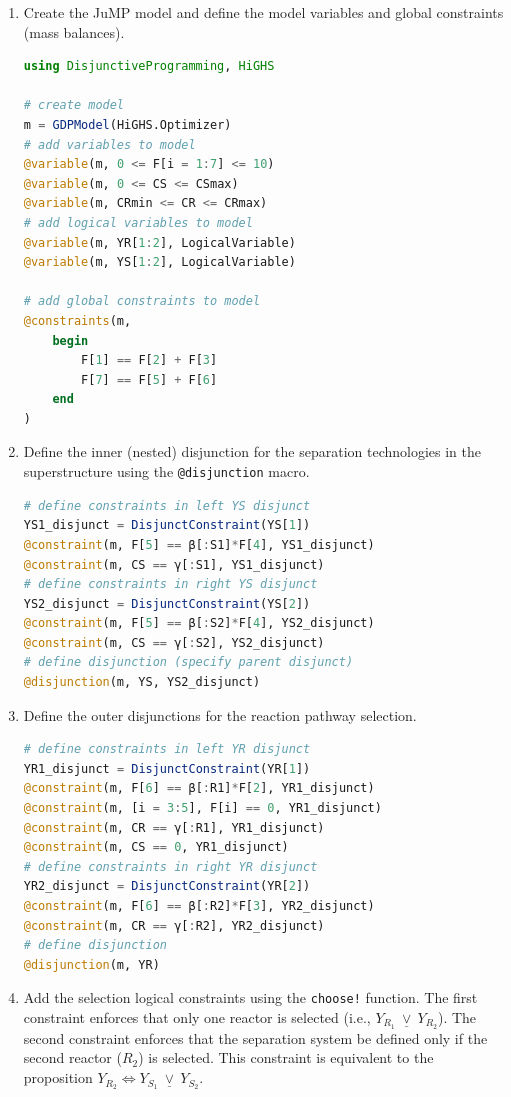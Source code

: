 \documentclass{juliacon}
\begin{document}
\begin{enumerate}
    \item Create the JuMP model and define the model variables and global constraints (mass balances).

\begin{lstlisting}[language = Julia]
using DisjunctiveProgramming, HiGHS

# create model
m = GDPModel(HiGHS.Optimizer)
# add variables to model
@variable(m, 0 <= F[i = 1:7] <= 10)
@variable(m, 0 <= CS <= CSmax)
@variable(m, CRmin <= CR <= CRmax)
# add logical variables to model
@variable(m, YR[1:2], LogicalVariable)
@variable(m, YS[1:2], LogicalVariable)

# add global constraints to model
@constraints(m,
    begin
        F[1] == F[2] + F[3]
        F[7] == F[5] + F[6]
    end
)
\end{lstlisting}
    \item Define the inner (nested) disjunction for the separation technologies in the superstructure using the \verb|@disjunction| macro.
\begin{lstlisting}[language = Julia]
# define constraints in left YS disjunct
YS1_disjunct = DisjunctConstraint(YS[1])
@constraint(m, F[5] == β[:S1]*F[4], YS1_disjunct)
@constraint(m, CS == γ[:S1], YS1_disjunct)
# define constraints in right YS disjunct
YS2_disjunct = DisjunctConstraint(YS[2])
@constraint(m, F[5] == β[:S2]*F[4], YS2_disjunct)
@constraint(m, CS == γ[:S2], YS2_disjunct)
# define disjunction (specify parent disjunct)
@disjunction(m, YS, YS2_disjunct)
\end{lstlisting}
    \item Define the outer disjunctions for the reaction pathway selection.
\begin{lstlisting}[language = Julia]
# define constraints in left YR disjunct
YR1_disjunct = DisjunctConstraint(YR[1])
@constraint(m, F[6] == β[:R1]*F[2], YR1_disjunct)
@constraint(m, [i = 3:5], F[i] == 0, YR1_disjunct)
@constraint(m, CR == γ[:R1], YR1_disjunct)
@constraint(m, CS == 0, YR1_disjunct)
# define constraints in right YR disjunct
YR2_disjunct = DisjunctConstraint(YR[2])
@constraint(m, F[6] == β[:R2]*F[3], YR2_disjunct)
@constraint(m, CR == γ[:R2], YR2_disjunct)
# define disjunction
@disjunction(m, YR)
\end{lstlisting}
    \item Add the selection logical constraints using the \verb|choose!| function. The first constraint enforces that only one reactor is selected (i.e., $Y_{R_1} \ \underline{\vee} \ Y_{R_2}$). The second constraint enforces that the separation system be defined only if the second reactor ($R_2$) is selected. This constraint is equivalent to the proposition $Y_{R_2} \Leftrightarrow Y_{S_1} \ \underline{\vee} \ Y_{S_2}$.

\end{enumerate}
\end{document}

